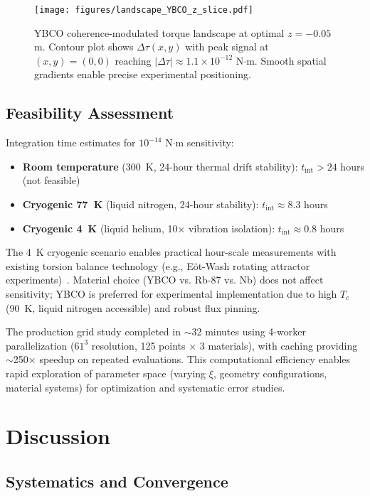 \documentclass[10pt,twocolumn]{article}
\providecommand{\checkmark}{\ding{51}}
\begin{document}
\begin{figure}[ht]
	\centering
	\texttt{[image: figures/landscape\_YBCO\_z\_slice.pdf]}
	\caption{YBCO coherence-modulated torque landscape at optimal $z = -0.05$ m. Contour plot shows $\Delta\tau(x, y)$ with peak signal at $(x, y) = (0, 0)$ reaching $|\Delta\tau| \approx 1.1 \times 10^{-12}$ N$\cdot$m. Smooth spatial gradients enable precise experimental positioning.}
	\label{fig:ybco_slice}
\end{figure}

\subsection{Feasibility Assessment}

Integration time estimates for $10^{-14}$ N$\cdot$m sensitivity:

\begin{itemize}
\item \textbf{Room temperature} (300~K, 24-hour thermal drift stability): $t_{\text{int}} > 24$ hours (not feasible)
\item \textbf{Cryogenic 77~K} (liquid nitrogen, 24-hour stability): $t_{\text{int}} \approx 8.3$ hours
\item \textbf{Cryogenic 4~K} (liquid helium, 10$\times$ vibration isolation): $t_{\text{int}} \approx 0.8$ hours \checkmark
\end{itemize}

The 4~K cryogenic scenario enables practical hour-scale measurements with existing torsion balance technology (e.g., Eöt-Wash rotating attractor experiments)~\cite{eotwash2008}. Material choice (YBCO vs. Rb-87 vs. Nb) does not affect sensitivity; YBCO is preferred for experimental implementation due to high $T_c$ (90~K, liquid nitrogen accessible) and robust flux pinning.

The production grid study completed in $\sim$32 minutes using 4-worker parallelization ($61^3$ resolution, 125 points $\times$ 3 materials), with caching providing $\sim$250$\times$ speedup on repeated evaluations. This computational efficiency enables rapid exploration of parameter space (varying $\xi$, geometry configurations, material systems) for optimization and systematic error studies.

\section{Discussion}

\subsection{Systematics and Convergence}
\end{document}
